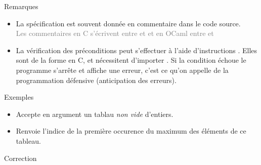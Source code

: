 \documentclass[10pt,french]{beamer}
\begin{document}
\begin{frame}{\Ctitle}{\stitle}
\begin{block}{Remarques}
\begin{itemize}
\item<1-> La spécification est souvent donnée en commentaire dans le code source. \\
 \textcolor{gray}{Les commentaires en C s'écrivent entre \kw{/*} et \kw{*/} et en OCaml entre \kw{(*} et \kw{*)}}
\item<3-> La vérification des préconditions peut s'effectuer à l'aide d'instructions . Elles sont de la forme  en C, et nécessitent d'importer . Si la condition échoue le programme s'arrête et affiche une erreur, c'est ce qu'on appelle de la programmation défensive (anticipation des erreurs).
\end{itemize}
\end{block}
\begin{exampleblock}{Exemples}
\begin{itemize}
	\item<5-> Accepte en argument un tablau \textit{non vide} d'entiers.
	\item<6-> Renvoie l'indice de la première occurence du maximum des éléments de ce tableau.
\end{itemize}
\end{exampleblock}
\end{frame}


\begin{frame}{\Ctitle}{\stitle}
	\begin{exampleblock}{Correction}
	\end{exampleblock}
\end{frame}
\end{document}
